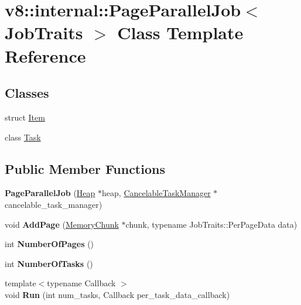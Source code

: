 \hypertarget{classv8_1_1internal_1_1_page_parallel_job}{}\section{v8\+:\+:internal\+:\+:Page\+Parallel\+Job$<$ Job\+Traits $>$ Class Template Reference}
\label{classv8_1_1internal_1_1_page_parallel_job}
\subsection*{Classes}
\begin{DoxyCompactItemize}
\item 
struct \hyperlink{structv8_1_1internal_1_1_page_parallel_job_1_1_item}{Item}
\item 
class \hyperlink{classv8_1_1internal_1_1_page_parallel_job_1_1_task}{Task}
\end{DoxyCompactItemize}
\subsection*{Public Member Functions}
\begin{DoxyCompactItemize}
\item 
{\bfseries Page\+Parallel\+Job} (\hyperlink{classv8_1_1internal_1_1_heap}{Heap} $\ast$heap, \hyperlink{classv8_1_1internal_1_1_cancelable_task_manager}{Cancelable\+Task\+Manager} $\ast$cancelable\+\_\+task\+\_\+manager)\hypertarget{classv8_1_1internal_1_1_page_parallel_job_a7b24b6f4259e36b72b1c9bfe3e79feb1}{}\label{classv8_1_1internal_1_1_page_parallel_job_a7b24b6f4259e36b72b1c9bfe3e79feb1}

\item 
void {\bfseries Add\+Page} (\hyperlink{classv8_1_1internal_1_1_memory_chunk}{Memory\+Chunk} $\ast$chunk, typename Job\+Traits\+::\+Per\+Page\+Data data)\hypertarget{classv8_1_1internal_1_1_page_parallel_job_acde7a3508b8a01b43441e8a26a1665a9}{}\label{classv8_1_1internal_1_1_page_parallel_job_acde7a3508b8a01b43441e8a26a1665a9}

\item 
int {\bfseries Number\+Of\+Pages} ()\hypertarget{classv8_1_1internal_1_1_page_parallel_job_a96a9fb8eb2a956eee5cd1556afb5673e}{}\label{classv8_1_1internal_1_1_page_parallel_job_a96a9fb8eb2a956eee5cd1556afb5673e}

\item 
int {\bfseries Number\+Of\+Tasks} ()\hypertarget{classv8_1_1internal_1_1_page_parallel_job_a68ac2a9685864294f53de532c36c8be1}{}\label{classv8_1_1internal_1_1_page_parallel_job_a68ac2a9685864294f53de532c36c8be1}

\item 
{\footnotesize template$<$typename Callback $>$ }\\void {\bfseries Run} (int num\+\_\+tasks, Callback per\+\_\+task\+\_\+data\+\_\+callback)\hypertarget{classv8_1_1internal_1_1_page_parallel_job_a50f1488b3e3b939a3dfe585808676a56}{}\label{classv8_1_1internal_1_1_page_parallel_job_a50f1488b3e3b939a3dfe585808676a56}

\end{DoxyCompactItemize}
